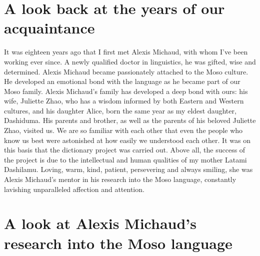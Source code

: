 \section*{A look back at the years of our acquaintance}

It was eighteen years ago that I first met Alexis Michaud, with whom I've been working ever since. A newly qualified doctor in linguistics, he was gifted, wise and determined. Alexis Michaud became passionately attached to the Moso culture. He developed an emotional bond with the language as he became part of our Moso family. Alexis Michaud's family has developed a deep bond with ours: his wife, Juliette Zhao, who has a wisdom informed by both Eastern and Western cultures, and his daughter Alice, born the same year as my eldest daughter, Dashiduma. His parents and brother, as well as the parents of his beloved Juliette Zhao, visited us. We are so familiar with each other that even the people who know us best were astonished at how easily we understood each other. It was on this basis that the dictionary project was carried out. Above all, the success of the project is due to the intellectual and human qualities of my mother Latami Dashilamu. Loving, warm, kind, patient, persevering and always smiling, she was Alexis Michaud's mentor in his research into the Moso language, constantly lavishing unparalleled affection and attention.

\section*{A look at Alexis Michaud's research into the Moso language}

